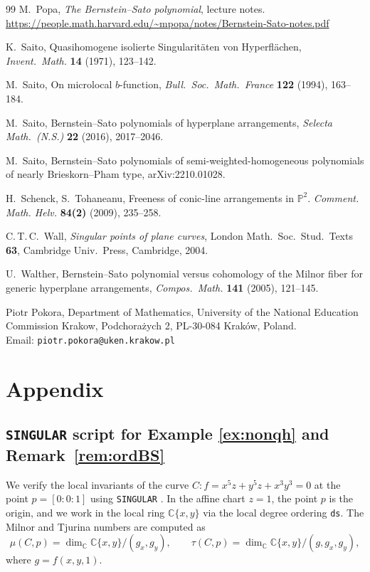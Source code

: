 \documentclass[11pt]{amsart}
\theoremstyle{definition}
\numberwithin{equation}{section}
\newcommand{\CC}{\mathbb{C}}
\newcommand{\gblock}{}
\begin{document}
\begin{thebibliography}{99}
M.~Popa, \emph{The Bernstein--Sato polynomial}, lecture notes. \url{https://people.math.harvard.edu/~mpopa/notes/Bernstein-Sato-notes.pdf}

K.~Saito, Quasihomogene isolierte Singularit\"aten von Hyperfl\"achen, \emph{Invent.\ Math.} \textbf{14} (1971), 123--142.

M.~Saito, On microlocal $b$-function, \emph{Bull.\ Soc.\ Math.\ France} \textbf{122} (1994), 163--184.

M.~Saito, Bernstein--Sato polynomials of hyperplane arrangements, \emph{Selecta Math.\ (N.S.)} \textbf{22} (2016), 2017--2046.

M.~Saito, Bernstein--Sato polynomials of semi-weighted-homogeneous polynomials of nearly Brieskorn--Pham type, arXiv:2210.01028.

  H.~Schenck, S.~Tohaneanu, Freeness of conic-line arrangements in $\mathbb{P}^2$. 
\textit{Comment. Math. Helv.} {\bf 84(2)} (2009), 235--258.

C.\,T.\,C.~Wall, \emph{Singular points of plane curves}, London Math.\ Soc.\ Stud.\ Texts \textbf{63}, Cambridge Univ.\ Press, Cambridge, 2004.

U.~Walther, Bernstein--Sato polynomial versus cohomology of the Milnor fiber for generic hyperplane arrangements, \emph{Compos.\ Math.} \textbf{141} (2005), 121--145.
\end{thebibliography}
\noindent
Piotr Pokora, 
Department of Mathematics,
University of the National Education Commission Krakow,
Podchora\.zych 2,
PL-30-084 Krak\'ow, Poland. \\
\nopagebreak
\noindent
Email: \texttt{piotr.pokora@uken.krakow.pl}

\appendix
\section*{Appendix}
\subsection*{\texttt{SINGULAR} script for Example \ref{ex:nonqh}\texorpdfstring{{\gblock{} and Remark~\ref{rem:ordBS}}}{ and Remark}}
We verify the local invariants of the curve
$C\colon f = x^5z + y^5z + x^3y^3 = 0$ at the point $p=[0:0:1]$ using
\texttt{SINGULAR} \cite{Sing}. In the affine chart $z=1$, the point $p$ is the origin,
and we work in the local ring $\CC\{x,y\}$ via the local degree ordering
\texttt{ds}. The Milnor and Tjurina numbers are computed as
\[
  \mu(C,p)=\dim_\CC \CC\{x,y\}/(g_x,g_y),
  \qquad
  \tau(C,p)=\dim_\CC \CC\{x,y\}/(g,g_x,g_y),
\]
where $g=f(x,y,1)$.
\end{document}
